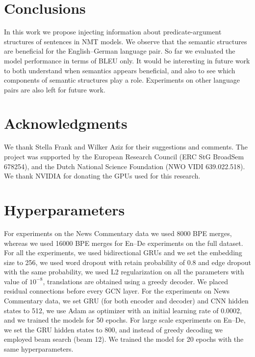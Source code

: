 \documentclass[11pt,a4paper]{article}
\begin{document}
\section{Conclusions}
In this work we propose injecting information about predicate-argument structures of sentences in NMT models.
We observe that the semantic structures are beneficial for the English--German language pair.
So far we evaluated the model performance in terms of BLEU only. 
It would be interesting in future work to both understand when semantics appears beneficial, and also to see which components of semantic structures play a role.
Experiments on other language pairs are also left for future work.


\section*{Acknowledgments}
We thank Stella Frank and Wilker Aziz for their suggestions and comments.
The project was supported by the European Research Council (ERC StG BroadSem 678254), and the Dutch National Science Foundation (NWO VIDI 639.022.518). 
We thank NVIDIA for donating the GPUs used for this research.





\appendix
\newpage

\newpage


\section{Hyperparameters}
\label{sec:hyperparameters}
For experiments on the News Commentary data we used 8000 BPE merges, whereas we used 16000 BPE merges for En--De experiments on the full dataset.
For all the experiments, we used bidirectional GRUs and we set the embedding size to 256, we used word dropout with retain probability of 0.8 and edge dropout with the same probability, we used L2 regularization on all the parameters with value of $10^{-8}$, translations are obtained using a greedy decoder.
We placed residual connections \cite{he2016deep} before every GCN layer.
For the experiments on News Commentary data, we set GRU (for both encoder and decoder) and CNN hidden states to 512, we use Adam \cite{kingma2015adam} as optimizer with an initial learning rate of 0.0002, and we trained the models for 50 epochs.
For large scale experiments on En--De, we set the GRU hidden states to 800, and instead of greedy decoding we employed beam search (beam 12). 
We trained the model for 20 epochs with the same hyperparameters.
\end{document}
